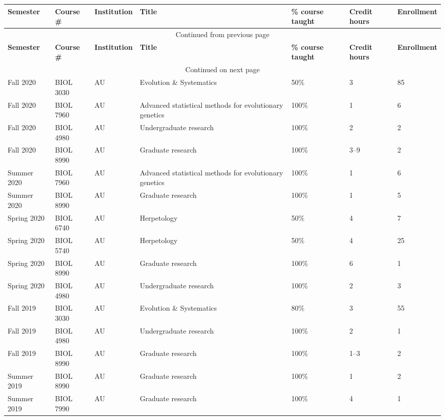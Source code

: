 {\sffamily\small
{}
\begin{longtable}[l]{ p{0.79in} p{0.65in} p{0.60in} p{1.7in} p{0.58in} p{0.34in} p{0.70in} }
    \hline
    \textbf{Semester} & \textbf{Course \#} & \textbf{Institution} & \textbf{Title} & \textbf{\% course taught} & \textbf{Credit hours} & \textbf{Enrollment} \\
    \hline
    \endfirsthead
    \multicolumn{7}{c}{{Continued from previous page}} \\
    \hline
    \textbf{Semester} & \textbf{Course \#} & \textbf{Institution} & \textbf{Title} & \textbf{\% course taught} & \textbf{Credit hours} & \textbf{Enrollment} \\
    \hline
    \endhead
    \hline \multicolumn{7}{c}{{Continued on next page}} \\
    \endfoot
    \hline
    \endlastfoot
    Fall 2020 & BIOL 3030 & AU & Evolution \& Systematics & 50\% & 3 & 85 \\
    Fall 2020 & BIOL 7960 & AU & Advanced statistical methods for evolutionary genetics & 100\% & 1 & 6 \\
    Fall 2020 & BIOL 4980 & AU & Undergraduate research & 100\% & 2 & 2 \\ 
    Fall 2020 & BIOL 8990 & AU & Graduate research & 100\% & 3--9 & 2 \\ 
    Summer 2020 & BIOL 7960 & AU & Advanced statistical methods for evolutionary genetics & 100\% & 1 & 6 \\
    Summer 2020 & BIOL 8990 & AU & Graduate research & 100\% & 1 & 5 \\ 
    Spring 2020 & BIOL 6740 & AU & Herpetology & 50\% & 4 & 7 \\
    Spring 2020 & BIOL 5740 & AU & Herpetology & 50\% & 4 & 25 \\
    Spring 2020 & BIOL 8990 & AU & Graduate research & 100\% & 6 & 1 \\ 
    Spring 2020 & BIOL 4980 & AU & Undergraduate research & 100\% & 2 & 3 \\ 
    Fall 2019 & BIOL 3030 & AU & Evolution \& Systematics & 80\% & 3 & 55 \\
    Fall 2019 & BIOL 4980 & AU & Undergraduate research & 100\% & 2 & 1 \\ 
    Fall 2019 & BIOL 8990 & AU & Graduate research & 100\% & 1--3 & 2 \\ 
    Summer 2019 & BIOL 8990 & AU & Graduate research & 100\% & 1 & 2 \\ 
    Summer 2019 & BIOL 7990 & AU & Graduate research & 100\% & 4 & 1 \\ 

\end{longtable}}
